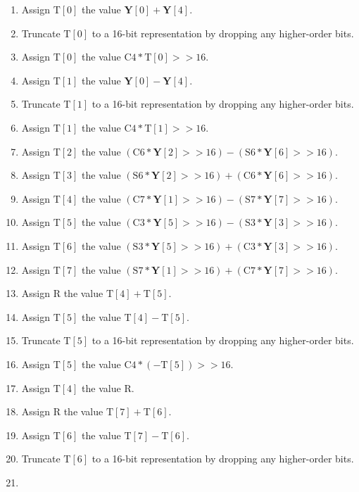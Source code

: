 \documentclass[9pt,letterpaper]{book}
\newcommand{\bitvar}[1]{\ensuremath{\mathbf{\bm{#1}}}}
\newcommand{\locvar}[1]{\ensuremath{\mathrm{#1}}}
\numberwithin{equation}{chapter}
\numberwithin{figure}{chapter}
\numberwithin{table}{chapter}
\begin{document}
\begin{enumerate}
\item
Assign $\locvar{T}[0]$ the value $\bitvar{Y}[0]+\bitvar{Y}[4]$.
\item
Truncate $\locvar{T}[0]$ to a 16-bit representation by dropping any
 higher-order bits.
\item
Assign $\locvar{T}[0]$ the value
 $\locvar{C4}*\locvar{T}[0]>>16$.
\item
Assign $\locvar{T}[1]$ the value $\bitvar{Y}[0]-\bitvar{Y}[4]$.
\item
Truncate $\locvar{T}[1]$ to a 16-bit representation by dropping any
 higher-order bits.
\item
Assign $\locvar{T}[1]$ the value $\locvar{C4}*\locvar{T}[1]>>16$.
\item
Assign $\locvar{T}[2]$ the value $(\locvar{C6}*\bitvar{Y}[2]>>16)-
 (\locvar{S6}*\bitvar{Y}[6]>>16)$.
\item
Assign $\locvar{T}[3]$ the value $(\locvar{S6}*\bitvar{Y}[2]>>16)+
 (\locvar{C6}*\bitvar{Y}[6]>>16)$.
\item
Assign $\locvar{T}[4]$ the value $(\locvar{C7}*\bitvar{Y}[1]>>16)-
 (\locvar{S7}*\bitvar{Y}[7]>>16)$.
\item
Assign $\locvar{T}[5]$ the value $(\locvar{C3}*\bitvar{Y}[5]>>16)-
 (\locvar{S3}*\bitvar{Y}[3]>>16)$.
\item
Assign $\locvar{T}[6]$ the value $(\locvar{S3}*\bitvar{Y}[5]>>16)+
 (\locvar{C3}*\bitvar{Y}[3]>>16)$.
\item
Assign $\locvar{T}[7]$ the value $(\locvar{S7}*\bitvar{Y}[1]>>16)+
 (\locvar{C7}*\bitvar{Y}[7]>>16)$.
\item
Assign \locvar{R} the value $\locvar{T}[4]+\locvar{T}[5]$.
\item
Assign $\locvar{T}[5]$ the value $\locvar{T}[4]-\locvar{T}[5]$.
\item
Truncate $\locvar{T}[5]$ to a 16-bit representation by dropping any
 higher-order bits.
\item
Assign $\locvar{T}[5]$ the value $\locvar{C4}*(-\locvar{T}[5])>>16$.
\item
Assign $\locvar{T}[4]$ the value $\locvar{R}$.
\item
Assign \locvar{R} the value $\locvar{T}[7]+\locvar{T}[6]$.
\item
Assign $\locvar{T}[6]$ the value $\locvar{T}[7]-\locvar{T}[6]$.
\item
Truncate $\locvar{T}[6]$ to a 16-bit representation by dropping any
 higher-order bits.
\item

\end{enumerate}
\end{document}
